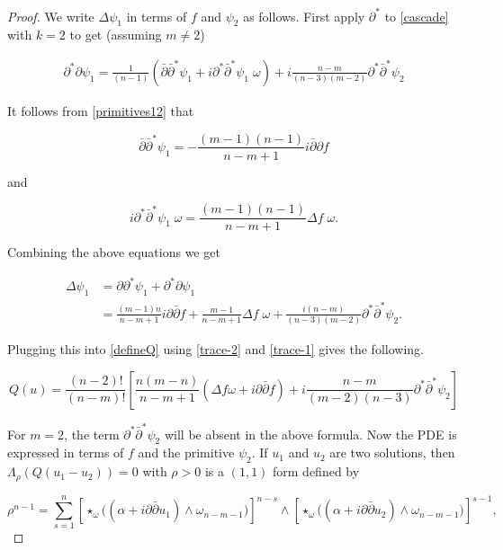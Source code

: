 \documentclass[10pt,a4paper]{amsart}
\newcommand{\sbpartial}{\bar{\partial}^*}
\newcommand{\spartial}{\partial^*}
\newcommand{\bpartial}{\bar{\partial}}
\numberwithin{equation}{section}
\begin{document}
\begin{proof}


We write $\Delta \psi_1$ in terms of $f$ and $\psi_2$ as follows. First apply $\spartial$ to \eqref{cascade} with $k=2$ to get (assuming $m\neq 2$)

\begin{equation}
    \begin{aligned}
        \spartial \partial \psi_{1} = \frac{1}{(n-1)} \left(\bpartial \sbpartial \psi_1 + i \spartial \sbpartial \psi_1 \; \omega\right) + i \frac{n-m}{(n-3)(m-2)} \spartial \sbpartial \psi_2 
    \end{aligned}
\end{equation}

It follows from \eqref{primitives12} that 

$$ \bpartial \sbpartial \psi_1 = -\frac{(m-1)(n-1)}{n-m+1} i\bpartial \partial f$$

\noindent and

$$i \spartial \sbpartial \psi_1 \; \omega = \frac{(m-1)(n-1)}{n-m+1} \Delta f \; \omega.$$


Combining the above equations we get

\begin{equation}
\begin{aligned}
    \Delta \psi_1 &= \partial \spartial \psi_1 + \spartial \partial \psi_1\\
    &= \frac{(m-1)n}{n-m+1} i \partial \bpartial f + \frac{m-1}{n-m+1} \Delta f \; \omega + \frac{i(n-m)}{(n-3)(m-2)} \spartial \sbpartial \psi_2.
\end{aligned}
\end{equation}

Plugging this into \eqref{defineQ} using \eqref{trace-2} and \eqref{trace-1} gives the following.


\begin{equation}\label{Q-fp1}
    Q(u) = \frac{(n-2)!}{(n-m)!} \left[ \frac{n(m-n)}{n-m+1} (\Delta f \omega +   i \partial \bar{\partial} f) + i \frac{n-m}{(m-2)(n-3)} \partial^* \bar{\partial}^* \psi_2 \right]
\end{equation}


For $m=2$, the term $\partial^* \bar{\partial}^* \psi_2$ will be absent in the above formula. Now the PDE is expressed in terms of $f$ and the primitive $\psi_2$. If $u_1$ and $u_2$ are two solutions, then $\Lambda_{\rho}(Q(u_1 - u_2)) = 0$ with $\rho >0$ is a $(1,1)$ form defined by

$$\rho^{n-1} = \sum_{s=1}^{n} \left[ \star_{\omega} \Big( (\alpha + i\partial\bar{\partial}u_1) \wedge \omega_{n-m-1} \Big) \right]^{n-s} \wedge \left[ \star_{\omega} \Big( (\alpha + i\partial\bar{\partial}u_2) \wedge \omega_{n-m-1} \Big) \right]^{s-1},$$



\end{proof}
\end{document}
